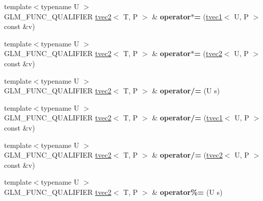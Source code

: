 \begin{DoxyCompactItemize}
\item 
\hypertarget{structglm_1_1tvec2_aacddba2473d9bb1871b30b33dd214bec}{{\footnotesize template$<$typename U $>$ }\\G\-L\-M\-\_\-\-F\-U\-N\-C\-\_\-\-Q\-U\-A\-L\-I\-F\-I\-E\-R \hyperlink{structglm_1_1tvec2}{tvec2}$<$ T, P $>$ \& {\bfseries operator$\ast$=} (\hyperlink{structglm_1_1tvec1}{tvec1}$<$ U, P $>$ const \&v)}\label{structglm_1_1tvec2_aacddba2473d9bb1871b30b33dd214bec}

\item 
\hypertarget{structglm_1_1tvec2_a993842ad4e15e45284bd39b7ceaa7dd3}{{\footnotesize template$<$typename U $>$ }\\G\-L\-M\-\_\-\-F\-U\-N\-C\-\_\-\-Q\-U\-A\-L\-I\-F\-I\-E\-R \hyperlink{structglm_1_1tvec2}{tvec2}$<$ T, P $>$ \& {\bfseries operator$\ast$=} (\hyperlink{structglm_1_1tvec2}{tvec2}$<$ U, P $>$ const \&v)}\label{structglm_1_1tvec2_a993842ad4e15e45284bd39b7ceaa7dd3}

\item 
\hypertarget{structglm_1_1tvec2_ac3a95afb4b83c4d4cee2de6ae41f4ccb}{{\footnotesize template$<$typename U $>$ }\\G\-L\-M\-\_\-\-F\-U\-N\-C\-\_\-\-Q\-U\-A\-L\-I\-F\-I\-E\-R \hyperlink{structglm_1_1tvec2}{tvec2}$<$ T, P $>$ \& {\bfseries operator/=} (U s)}\label{structglm_1_1tvec2_ac3a95afb4b83c4d4cee2de6ae41f4ccb}

\item 
\hypertarget{structglm_1_1tvec2_a19b74b0db17121ccf51b68fc25e579a2}{{\footnotesize template$<$typename U $>$ }\\G\-L\-M\-\_\-\-F\-U\-N\-C\-\_\-\-Q\-U\-A\-L\-I\-F\-I\-E\-R \hyperlink{structglm_1_1tvec2}{tvec2}$<$ T, P $>$ \& {\bfseries operator/=} (\hyperlink{structglm_1_1tvec1}{tvec1}$<$ U, P $>$ const \&v)}\label{structglm_1_1tvec2_a19b74b0db17121ccf51b68fc25e579a2}

\item 
\hypertarget{structglm_1_1tvec2_a572fa5d63392fd44f7bbdd35cbed43ca}{{\footnotesize template$<$typename U $>$ }\\G\-L\-M\-\_\-\-F\-U\-N\-C\-\_\-\-Q\-U\-A\-L\-I\-F\-I\-E\-R \hyperlink{structglm_1_1tvec2}{tvec2}$<$ T, P $>$ \& {\bfseries operator/=} (\hyperlink{structglm_1_1tvec2}{tvec2}$<$ U, P $>$ const \&v)}\label{structglm_1_1tvec2_a572fa5d63392fd44f7bbdd35cbed43ca}

\item 
\hypertarget{structglm_1_1tvec2_acfc4203006625ad7ce3bece1ffc11b97}{{\footnotesize template$<$typename U $>$ }\\G\-L\-M\-\_\-\-F\-U\-N\-C\-\_\-\-Q\-U\-A\-L\-I\-F\-I\-E\-R \hyperlink{structglm_1_1tvec2}{tvec2}$<$ T, P $>$ \& {\bfseries operator\%=} (U s)}\label{structglm_1_1tvec2_acfc4203006625ad7ce3bece1ffc11b97}


\end{DoxyCompactItemize}
